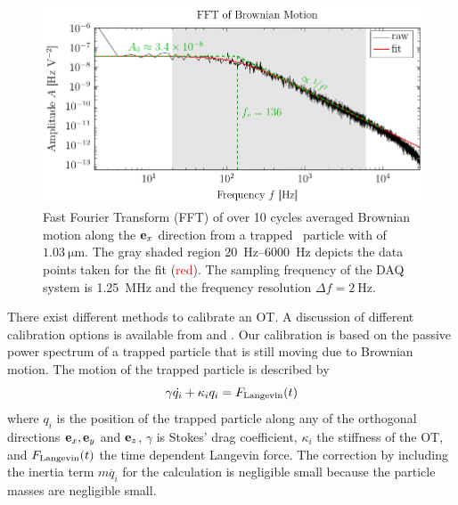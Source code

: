 \begin{figure}[tbp]
  \centering
  \includegraphics[]{External/calibration.pdf}
  \caption{Fast Fourier Transform (FFT) of over 10 cycles averaged Brownian 
    motion along the $\vb{e}_{x}$ direction from a trapped \SiO~particle with of 
    $\SI{1.03}{\um}$. The gray shaded region \SIrange{20}{6000}{\hertz} depicts 
    the data points taken for the fit (\textcolor{red}{red}). The sampling 
  frequency of the DAQ system is \SI{1.25}{\mega\hertz} and the frequency 
resolution $\Delta f=\SI{2}{\hertz}$.}
  \label{fig:TO-calibration}
\end{figure}

There exist different methods to calibrate an OT. A discussion of different 
calibration options is available from  and . 
Our calibration is based on the passive power spectrum of a trapped particle 
that is still moving due to Brownian motion. The motion of the trapped particle 
is described by
\begin{equation}
  \gamma\dot{q_{i}} + \kappa_{i}q_{i} = F_{\mathrm{Langevin}}(t)
  \label{eq:TO-cal-eom}
\end{equation}
where $q_{i}$ is the position of the trapped particle along any of the 
orthogonal directions $\vb{e}_{x}, \vb{e}_{y}$ and $\vb{e}_{z}$, $\gamma$ is Stokes' drag 
coefficient, $\kappa_{i}$ the stiffness of the OT, and $F_{\mathrm{Langevin}}(t)$ the time 
dependent Langevin force. The correction by including the inertia term 
$m\ddot{q_{i}}$ for the calculation is negligible small because the particle 
masses are negligible small.

